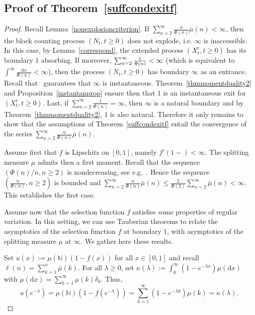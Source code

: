 \documentclass[10pt]{amsart}
\theoremstyle{definition}\newtheorem{defi}[theo]{Definition}\newtheorem{rema}[theo]{Remark}\newtheorem{exam}[theo]{Example}\newtheorem{exem}[theo]{Example}\newtheorem{nota}[theo]{Notation}
\newcommand{\ddr}{\mathrm{d}}
\newcommand{\rmr}{\mathrm{r}}
\newcommand{\bbN}{\mathbb{N}}
\begin{document}
\subsection{Proof of Theorem~\ref{suffcondexitf}} 

\begin{proof}
Recall Lemma~\ref{nonexplosioncriterion}. If $\sum_{n=2}^{\infty}\frac{n}{\Phi(n)}\bar{\mu}(n)<\infty$, then the block counting process $(N_t,t\geq 0)$ does not explode, i.e. $\infty$ is inaccessible. In this case, by Lemma~\ref{correspond}, the extended process $(X_t^{\rmr},t\geq 0)$ has its boundary $1$ absorbing. If moreover, $\sum_{n=2}^{\infty}\frac{1}{\Phi(n)}\linebreak<\infty$ (which is equivalent to $\int^{\infty}\frac{\ddr x}{\Phi(x)}<\infty$), then the process $(N_t,t\geq 0)$ has boundary $\infty$ as an entrance. Recall that~\cite[Lemma~2.5]{cdiEFC} guarantees that $\infty$ is instantaneous. Theorem~\ref{thmmomentduality2} and Proposition~\ref{instantanprop} ensure then that $1$ is an instantaneous exit for $(X_t^{\rmr},t\geq 0)$. Last, if $\sum_{n=2}^{\infty}\frac{1}{\Phi(n)}=\infty$, then $\infty$ is a natural boundary and by Theorem~\ref{thmmomentduality2}, $1$ is also natural. Therefore it only remains to show that the assumptions of Theorem~\ref{suffcondexitf} entail the convergence of the series $\sum_{n=2}^{\infty}\frac{n}{\Phi(n)}\bar{\mu}(n)$.

Assume first that $f$ is Lipschitz on $[0,1]$, namely $f'(1-)<\infty$. The splitting measure $\mu$ admits then a first moment. Recall that the sequence $(\Phi(n)/n, n\geq 2)$ is nondecreasing, see e.g.~\cite[Lemma~2.1-(iv)]{limic2015}. Hence the sequence $(\frac{n}{\Phi(n)},n\geq 2)$ is bounded and $\sum_{n=2}^{\infty}\frac{n}{\Phi(n)}\bar{\mu}(n)\leq \frac{2}{\Phi(2)}\sum_{n=2}^{\infty}\bar{\mu}(n)<\infty$. This establishes the first case.

Assume now that the selection function $f$ satisfies some properties of regular variation. In this setting, we can use Tauberian theorems to relate the asymptotics of the selection function $f$ at boundary $1$, with asymptotics of the splitting measure $\mu$ at $\infty$. We gather here these results.

Set $u(x):=\mu(\bbN)(1-f(x))$ for all $x\in [0,1]$ and recall $\ell(n)=\sum_{k=1}^{n}\bar{\mu}(k)$. For all $\lambda \geq 0$, set $\kappa(\lambda):=\int_{0}^{\infty}(1-e^{-\lambda x})\mu(\ddr x)$ with $\mu(\ddr x)=\sum_{k=1}^{\infty}\mu(k)\delta_k$. Thus,
\begin{equation}\label{equiv}
u(e^{-\lambda})=\mu(\bbN)\left(1-f(e^{-\lambda})\right)=\sum_{k=1}^{\infty}\left(1-e^{-\lambda k}\right)\mu(k)=\kappa(\lambda).
\end{equation}


\end{proof}
\end{document}
